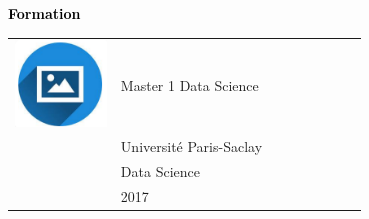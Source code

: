 \documentclass{article}
\begin{document}
\begin{paracol}{2}
\vspace{1cm}

\textcolor{black}{\Large \textbf{Formation}} \\

\begin{tabular}{@{}cp{0.7\linewidth}}
      \begin{minipage}{0.05\linewidth}
        \includegraphics[width=\linewidth]{picon.png}
      \end{minipage} & \vspace{-12pt}
      {\color{sidetext} Master 1 Data Science} \\[-6pt]
      & Université Paris-Saclay \\ 
      & Data Science \\ 
      & 2017 
\end{tabular}

\vspace{0.5cm}


\end{paracol}
\end{document}
